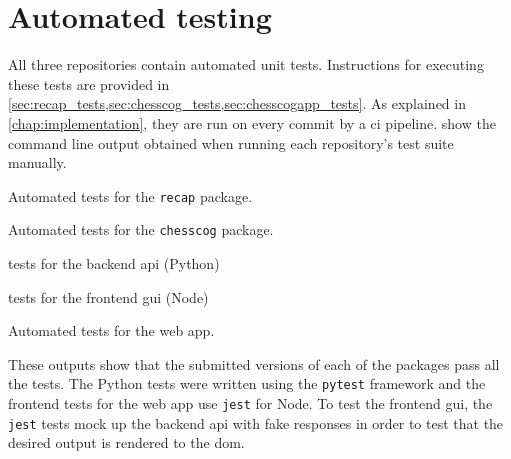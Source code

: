 \documentclass[../../report.tex]{subfiles}
\begin{document}
\section{Automated testing}
All three repositories contain automated unit tests.
Instructions for executing these tests are provided in \cref{sec:recap_tests,sec:chesscog_tests,sec:chesscogapp_tests}.
As explained in \cref{chap:implementation}, they are run on every commit by a \gls{ci} pipeline.
 show the command line output obtained when running each repository's test suite manually.
\begin{listing}
    
    \caption{Automated tests for the \texttt{recap} package.}
    \label{lst:tests_recap}
\end{listing}%
\begin{listing}
    
    \caption{Automated tests for the \texttt{chesscog} package.}
    \label{lst:tests_chesscog}
\end{listing}%
\begin{listing}
    \begin{sublisting}[b]{\textwidth}
        
        \caption{tests for the backend \acs{api} (Python)}
    \end{sublisting}
    \bigskip\par
    \begin{sublisting}[b]{\textwidth}
        
        \caption{tests for the frontend \acs{gui} (Node)}
    \end{sublisting}
    \caption{Automated tests for the web app.}
    \label{lst:tests_chesscogapp}
\end{listing}%
These outputs show that the submitted versions of each of the packages pass all the tests.
The Python tests were written using the \texttt{pytest} framework and the frontend tests for the web app use \texttt{jest} for Node.
To test the frontend \gls{gui}, the \texttt{jest} tests mock up the backend \gls{api} with fake responses in order to test that the desired output is rendered to the \gls{dom}.
\end{document}
